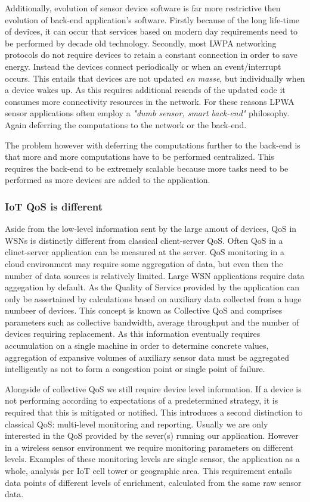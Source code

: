 Additionally, evolution of sensor device software is far more restrictive then evolution of back-end application's software. Firstly because of the long life-time of devices, it can occur that services based on modern day requirements need to be performed by decade old technology. Secondly, most LWPA networking protocols do not require devices to retain a constant connection in order to save energy\cite{tmobile, vodafone, iets met nbiot specs}. Instead the devices connect periodically or when an event/interrupt occurs. This entails that devices are not updated \emph{en masse}, but individually when a device wakes up. As this requires additional resends of the updated code it consumes more connectivity resources in the network. For these reasons LPWA sensor applications often employ a \emph{"dumb sensor, smart back-end"} philosophy. Again deferring the computations to the network or the back-end.

The problem however with deferring the computations further to the back-end is that more and more computations have to be performed centralized. This requires the back-end to be extremely scalable because more tasks need to be performed as more devices are added to the application.

\subsubsection{IoT QoS is different}
Aside from the low-level information sent by the large amout of devices, QoS in WSNs is distinctly different from classical client-server QoS. Often QoS in a clinet-server application can be measured at the server. QoS monitoring in a cloud environment may require some aggregation of data, but even then the number of data sources is relatively limited. Large WSN applications require data aggegation by default. As the Quality of Service provided by the application can only be assertained by calculations based on auxiliary data collected from a huge numbeer of devices. This concept is known as Collective QoS \cite{collective_qos} and comprises parameters such as collective bandwidth, average throughput and the number of devices requiring replacement. As this information eventually requires accumulation on a single machine in order to determine concrete values, aggregation of expansive volumes of auxiliary sensor data must be aggregated intelligently as not to form a congestion point or single point of failure.

Alongside of collective QoS we still require device level information. If a device is not performing according to expectations of a predetermined strategy, it is required that this is mitigated or notified. This introduces a second distinction to classical QoS: multi-level monitoring and reporting. Usually we are only interested in the QoS provided by the sever(s) running our application. However in a wireless sensor environment we require monitoring parameters on different levels. Examples of these monitoring levels are single sensor, the application as a whole, analysis per IoT cell tower or geographic area. This requirement entails data points of different levels of enrichment, calculated from the same raw sensor data.

